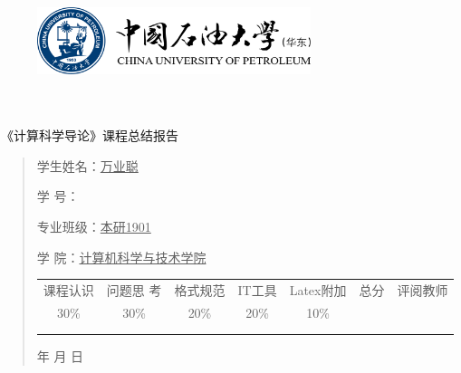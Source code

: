 \documentclass{article}
\renewcommand{\today}{\number\year 年 \number\month 月 \number\day 日}
\begin{document}
\begin{figure}
    \centering
    \includegraphics[width=8cm]{upc.png}

    \label{figupc}
\end{figure}

	\begin{center}
		\quad \\
		\quad \\
		\heiti \fontsize{45}{17} \quad \quad \quad 
		\vskip 1.5cm
		\heiti {} 《计算科学导论》课程总结报告
	\end{center}
	\vskip 2.0cm
		
	\begin{quotation}
		\doublespacing
		
        \par\setlength\parindent{7em}
		\quad 

		学生姓名：\underline{\qquad  万业聪 \qquad \qquad}

		学\hspace{0.61cm} 号：\underline{\qquad}
		
		专业班级：\underline{\qquad 本研1901 \qquad  }
		
        学\hspace{0.61cm} 院：\underline{计算机科学与技术学院}
		\vskip 2cm
		\centering
		\begin{table}[h]
            \centering 
            \begin{tabular}{|c|c|c|c|c|c|c|}
                \hline
                课程认识 & 问题思 考 & 格式规范  & IT工具  & Latex附加  & 总分 & 评阅教师 \\
                30\% & 30\% & 20\% & 20\% & 10\% &  &  \\
                \hline
                 & & & & & &\\
                & & & & & &\\
                \hline
            \end{tabular}
        \end{table}
		\vskip 2cm
		\today
	\end{quotation}
\end{document}
